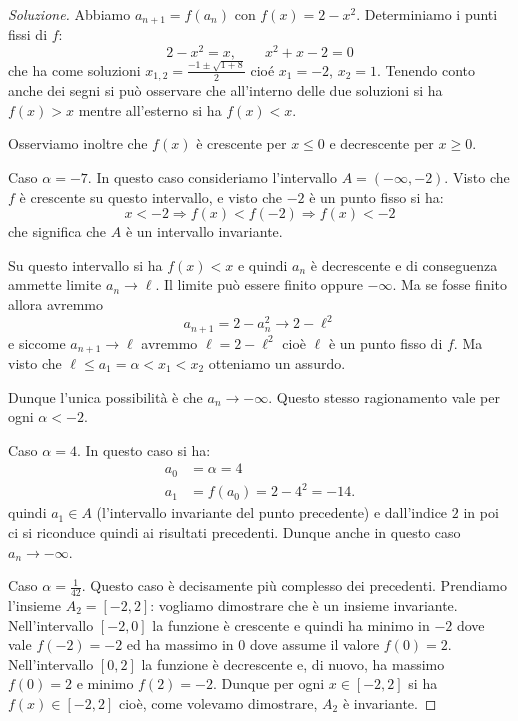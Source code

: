 \begin{proof}[Soluzione]
  Abbiamo $a_{n+1} = f(a_n)$ con $f(x) = 2-x^2$. Determiniamo i punti
  fissi di $f$:
  \[
  2-x^2 = x, \qquad x^2 + x - 2 = 0
  \]
  che ha come soluzioni $x_{1,2} = \frac{-1\pm\sqrt{1+8}}{2}$ cioé
  $x_1 = -2$, $x_2 = 1$. Tenendo conto anche dei segni si può
  osservare che all'interno delle due soluzioni si ha $f(x)>x$ mentre
  all'esterno si ha $f(x)<x$.

  Osserviamo inoltre che $f(x)$ è crescente per
  $x\le 0$ e decrescente per $x\ge 0$.

  Caso $\alpha=-7$. In questo caso consideriamo l'intervallo
  $A=(-\infty, -2)$. Visto che $f$ è crescente su questo intervallo,
  e visto che $-2$ è un punto fisso si ha:
  \[
  x < -2 \Rightarrow f(x) < f(-2) \Rightarrow f(x) < -2
  \]
  che significa che $A$ è un intervallo invariante.

  Su questo intervallo si ha $f(x)<x$ e quindi $a_n$ è decrescente e
  di conseguenza ammette limite $a_n\to \ell$. Il limite può essere
  finito oppure $-\infty$. Ma se fosse finito allora avremmo
  \[
  a_{n+1} = 2 - a_n^2 \to 2 - \ell^2
  \]
  e siccome $a_{n+1}\to \ell$ avremmo $\ell = 2 - \ell^2$ cioè $\ell$
  è un punto fisso di $f$. Ma visto che $\ell \le a_1 = \alpha < x_1 <
  x_2$ otteniamo un assurdo.

  Dunque l'unica possibilità è che $a_n \to -\infty$. Questo
  stesso ragionamento vale per ogni $\alpha<-2$.

  Caso $\alpha=4$. In questo caso si ha:
  \begin{align*}
    a_0 &= \alpha = 4\\
    a_1 &= f(a_0) = 2 - 4^2 = -14.
  \end{align*}
  quindi $a_1 \in A$ (l'intervallo invariante del punto precedente) e
  dall'indice $2$ in poi ci si riconduce quindi ai risultati
  precedenti. Dunque anche in questo caso $a_n \to -\infty$.

  Caso $\alpha = \frac 1{42}$. Questo caso è decisamente più complesso dei
  precedenti. Prendiamo l'insieme $A_2 = [-2, 2]$: vogliamo dimostrare
  che è un insieme invariante. Nell'intervallo $[-2,0]$ la funzione è
  crescente e quindi ha minimo in $-2$ dove vale $f(-2)=-2$ ed ha
  massimo in $0$ dove assume il valore $f(0) = 2$. Nell'intervallo
  $[0,2]$ la funzione è decrescente e, di nuovo, ha massimo $f(0)=2$ e
  minimo $f(2)=-2$. Dunque per ogni $x\in [-2,2]$ si ha $f(x) \in
  [-2,2]$ cioè, come volevamo dimostrare, $A_2$ è invariante.


\end{proof}
